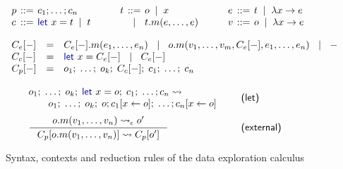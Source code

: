 \documentclass[english,crc,references=cleveref]{programming}
\theoremstyle{plain}
\theoremstyle{definition}
\newcommand{\lsep}{\;\;|\;\;}
\newcommand{\kvd}[1]{\textnormal{\textcolor{kvdclr}{\sffamily #1}}}
\newcommand{\narrow}[1]{\hspace{-0.6em}#1\hspace{-0.6em}}
\newcommand{\rname}[1]{{\sffamily(#1)}}
\begin{document}

\begin{figure}
\raggedright
\hspace{0.5em}{\sffamily Programs, commands, terms, expressions and values}
%
\begin{equation*}
\begin{array}{lcl}
p &\narrow{::=}& c_1; \ldots; c_n\\
c &\narrow{::=}& \kvd{let}~x = t \lsep t\\
\end{array}
\qquad
\begin{array}{lcl}
t &\narrow{::=}& o \lsep x \\
  &\narrow{|}& t.m(e, \ldots, e)
\end{array}
\qquad
\begin{array}{lcl}
e &\narrow{::=}& t \lsep \lambda x\rightarrow e\\
v &\narrow{::=}& o \lsep \lambda x\rightarrow e\\
\end{array}
\end{equation*}

%
\hspace{0.5em}{\sffamily Evaluation contexts of expressions}
%
\begin{equation*}
\begin{array}{lcl}
C_e[-] &=& C_e[-].m(e_1, \ldots, e_n) ~\lsep~ o.m(v_1, \ldots, v_{m}, C_e[-], e_1,\ldots , e_n) ~\lsep~ -\\
C_c[-] &=& \kvd{let}~x = C_e[-] ~\lsep~ C_e[-]\\
C_p[-] &=& o_1;\; \ldots;\; o_{k};\; C_c[-];\; c_{1};\; \ldots;\; c_n\\
\end{array}
\end{equation*}

%
\hspace{0.5em}{\sffamily Let elimination and member reduction}
%
\begin{equation*}
\begin{array}{ll}
\hspace{-0.5em}\begin{array}{l}
o_1;\; \ldots;\; o_{k};\; \kvd{let}~x=o;\; c_{1};\; \ldots; c_n \rightsquigarrow\\
\qquad  o_1;\; \ldots;\; o_{k};\; o; c_{1}[x\leftarrow o];\; \ldots; c_n[x\leftarrow o]\end{array} &
\quad\text{\rname{let}}\\[1.2em]
\inference
  {o.m(v_1, \ldots, v_n) \rightsquigarrow_\epsilon o'}
  {C_p[o.m(v_1, \ldots, v_n)] \rightsquigarrow C_p[o']} &
\quad\text{\rname{external}}
\end{array}
\end{equation*}

\caption{Syntax, contexts and reduction rules of the data exploration calculus}
\label{fig:dec-calculus}
\end{figure}
\end{document}
